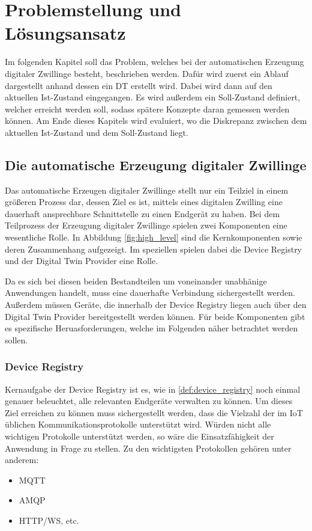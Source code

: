 \chapter{Problemstellung und Lösungsansatz}

Im folgenden Kapitel soll das Problem, welches bei der automatischen Erzeugung digitaler Zwillinge besteht, beschrieben werden. Dafür wird zuerst ein Ablauf dargestellt anhand dessen ein \ac{DT} erstellt wird. Dabei wird dann auf den aktuellen Ist-Zustand eingegangen. Es wird außerdem ein Soll-Zustand definiert, welcher erreicht werden soll, sodass spätere Konzepte daran gemessen werden können. Am Ende dieses Kapitels wird evaluiert, wo die Diskrepanz zwischen dem aktuellen Ist-Zustand und dem Soll-Zustand liegt.

\section{Die automatische Erzeugung digitaler Zwillinge}

Das automatische Erzeugen digitaler Zwillinge stellt nur ein Teilziel in einem größeren Prozess dar, dessen Ziel es ist, mittels eines digitalen Zwilling eine dauerhaft ansprechbare Schnittstelle zu einen Endgerät zu haben. Bei dem Teilprozess der Erzeugung digitaler Zwillinge spielen zwei Komponenten eine wesentliche Rolle. In Abbildung \vref{fig:high_level} sind die Kernkomponenten sowie deren Zusammenhang aufgezeigt. Im speziellen spielen dabei die Device Registry und der Digital Twin Provider eine Rolle.

Da es sich bei diesen beiden Bestandteilen um voneinander unabhänige Anwendungen handelt, muss eine dauerhafte Verbindung sichergestellt werden. Außerdem müssen Geräte, die innerhalb der Device Registry liegen auch über den Digital Twin Provider bereitgestellt werden können. Für beide Komponenten gibt es spezifische Heruasforderungen, welche im Folgenden näher betrachtet werden sollen.

\subsection{Device Registry}

Kernaufgabe der Device Registry ist es, wie in \vref{def:device_registry} noch einmal genauer beleuchtet, alle relevanten Endgeräte verwalten zu können. Um dieses Ziel erreichen zu können muss sichergestellt werden, dass die Vielzahl der im \ac{IoT} üblichen Kommunikationsprotokolle unterstützt wird. Würden nicht alle wichtigen Protokolle unterstützt werden, so wäre die Einsatzfähigkeit der Anwendung in Frage zu stellen. Zu den wichtigsten Protokollen gehören unter anderem:
\begin{itemize}
    \item MQTT
    \item AMQP
    \item HTTP/WS, etc.
\end{itemize}

